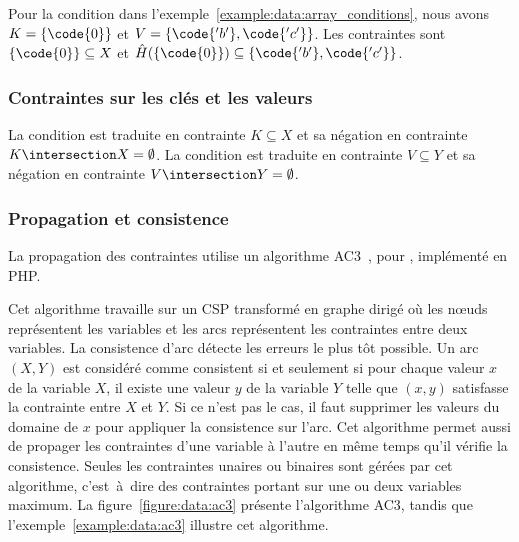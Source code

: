 Pour la condition  dans
l'exemple~\ref{example:data:array_conditions}, nous avons $K = \{\code{0}\}$ et
$V = \{\code{'b'}, \code{'c'}\}$. Les contraintes sont $\{\code{0}\} \subseteq
X$ et $\hat{H}(\{\code{0}\}) \subseteq \{\code{'b'}, \code{'c'}\}$.

\subsubsection{Contraintes sur les clés et les valeurs}

La condition  est traduite en contrainte $K \subseteq X$ et sa
négation  en contrainte $K \intersection X = \emptyset$. La
condition  est traduite en contrainte $V \subseteq Y$ et sa
négation  en contrainte $V \intersection Y = \emptyset$.

\subsubsection{Propagation et consistence}

La propagation des contraintes utilise un algorithme AC3~,
pour , implémenté en PHP.

Cet algorithme travaille sur un CSP transformé en graphe dirigé où les nœuds
représentent les variables et les arcs représentent les contraintes entre deux
variables. La consistence d'arc détecte les erreurs le plus tôt possible. Un arc
$(X, Y)$ est considéré comme consistent si et seulement si pour chaque valeur
$x$ de la variable $X$, il existe une valeur $y$ de la variable $Y$ telle que
$(x, y)$ satisfasse la contrainte entre $X$ et $Y$.  Si ce n'est pas le cas, il
faut supprimer les valeurs du domaine de $x$ pour appliquer la consistence sur
l'arc. Cet algorithme permet aussi de propager les contraintes d'une variable à
l'autre en même temps qu'il vérifie la consistence. Seules les contraintes
unaires ou binaires sont gérées par cet algorithme, c'est~à~dire des contraintes
portant sur une ou deux variables maximum. La figure~\ref{figure:data:ac3}
présente l'algorithme AC3, tandis que l'exemple~\ref{example:data:ac3} illustre
cet algorithme.


